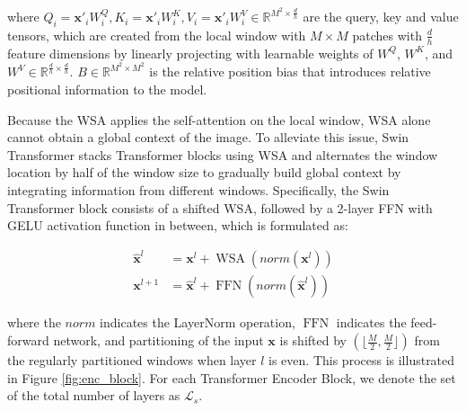 \documentclass[journal]{IEEEtran}
\begin{document}
where $Q_i = \mathbf{x}'_iW^Q_i, K_i=\mathbf{x}'_iW^K_i, V_i=\mathbf{x}'_iW^V_i \in \mathbb{R}^{M^2\times \frac{d}{h}}$ are the query, key and value tensors, which are created from the local window with $M \times M$ patches with $\frac{d}{h}$ feature dimensions by linearly projecting with learnable weights of $W^Q$, $W^K$, and $W^V \in \mathbb{R}^{\frac{d}{h}\times \frac{d}{h}}$. $B \in \mathbb{R}^{M^2 \times M^2}$ is the relative position bias \cite{liu2021swin} that introduces relative positional information to the model. 

Because the WSA applies the self-attention on the local window, WSA alone cannot obtain a global context of the image. To alleviate this issue, Swin Transformer stacks Transformer blocks using WSA and alternates the window location by half of the window size to gradually build global context by integrating information from different windows. Specifically, the Swin Transformer block consists of a shifted WSA, followed by a 2-layer FFN with GELU activation function in between, which is formulated as:



\begin{equation}
\begin{split}
    \hat{\mathbf{x}}^l &= \mathbf{x}^l + \operatorname{WSA}(norm(\mathbf{x}^l))\\
    \mathbf{x}^{l+1} &= \hat{\mathbf{x}}^l + \operatorname{FFN}(norm(\hat{\mathbf{x}}^l))
\end{split}
\end{equation}

where the $norm$ indicates the LayerNorm \cite{ba2016layer} operation, $\operatorname{FFN}$ indicates the feed-forward network, and partitioning of the input $\mathbf{x}$ is shifted by $(\lfloor \frac{M}{2}, \frac{M}{2} \rfloor )$ from the regularly partitioned windows when layer $l$ is even. This process is illustrated in Figure \ref{fig:enc_block}. For each Transformer Encoder Block, we denote the set of the total number of layers as $\mathcal{L}_s$.
\end{document}
